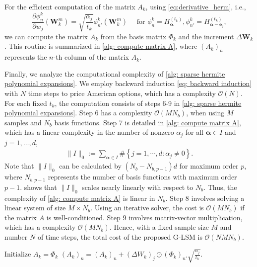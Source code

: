 \documentclass[10pt,a4paper]{amsart}
\numberwithin{equation}{section}
\numberwithin{algorithm}{section}
\theoremstyle{plain}
\theoremstyle{remark}
\begin{document}
For the efficient computation of the matrix $A_k$, using \cref{eq:derivative_herm}, i.e.,
\begin{equation} \label{eq:basis-derivative}
    \frac{\partial \phi_n^{k}}{\partial w_j}(\mathbf{W}^m_k) = \sqrt{\frac{\alpha_j}{t_k}} \phi_{n'}^{k}(\mathbf{W}^m_k) \quad \text{ for } \phi_n^{k} = H_{\bm{\alpha}}^{(t_k)}, \phi_{n'}^{k} = H_{\bm{\alpha} - \mathbf{e}_j}^{(t_k)},
\end{equation}
we can compute the matrix $A_k$ from the basis matrix $\Phi_k$ and the increment $\Delta\mathbf{W}_k$. This routine is summarized in \cref{alg: compute matrix A}, where $(A_k)_{n}$ represents the $n$-th column of the matrix $A_k$.

Finally, we analyze the computational complexity of \cref{alg: sparse hermite polynomial expansions}. We employ backward induction \cref{eq: backward induction} with $N$ time steps to price American options, which has a complexity $\mathcal{O}(N)$. For each fixed $t_k$, the computation consists of steps 6-9 in \cref{alg: sparse hermite polynomial expansions}. Step 6 has a complexity $\mathcal{O}(MN_b)$, when using $M$ samples and $N_b$ basis functions. Step 7 is detailed in \cref{alg: compute matrix A}, which has a linear complexity in the number of nonzero $\alpha_j$ for all $\bm{\alpha} \in I$ and $j=1,\dots,d$, 
\begin{align*}
\|I\|_0:=\sum_{\bm{\alpha}\in I}\#\left\{j=1,\cdots,d: \alpha_j\neq 0\right\}. 
\end{align*}
Note that $\|I\|_0$ can be calculated by $(N_b - N_{b,p-1})d$ for maximum order $p$, where $N_{b,p-1}$ represents the number of basis functions with maximum order $p-1$.  shows that $\|I\|_0$ scales nearly linearly with respect to $N_b$. Thus, the complexity of \cref{alg: compute matrix A} is linear in $N_b$. Step 8 involves solving a linear system of size $M\times N_b$. Using an iterative solver, the cost is $\mathcal{O}(MN_b)$ if the matrix $A$ is well-conditioned. Step 9 involves matrix-vector multiplication, which has a complexity $\mathcal{O}(MN_b)$. Hence, with a fixed sample size $M$ and number $N$ of time steps, the total cost of the proposed G-LSM is $\mathcal{O}(NMN_b)$. 

\begin{algorithm}[htbp]
\caption{Compute the matrix $A_k$ using $I, \Phi_k$ and $\Delta\mathbf{W}_k$}
\label{alg: compute matrix A}
\begin{algorithmic}[1]
\STATE Initialize $A_k = \Phi_k$ 
        \STATE $(A_k)_{n} = (A_k)_{n} + (\Delta W_k)_j \odot (\Phi_k)_{n'} \sqrt{\frac{\alpha_j}{t_k}}$.
        \ENDIF
    \ENDFOR
\ENDFOR
\end{algorithmic}
\end{algorithm}
\end{document}
